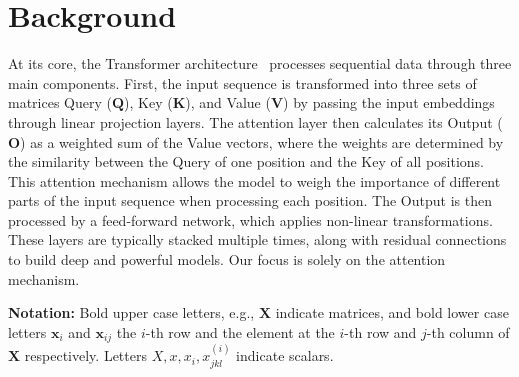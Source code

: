 \section{Background}
\label{related-works}
\par At its core, the Transformer architecture~\cite{Vaswani2017-vf} processes sequential data through three main components. First, the input sequence is transformed into three sets of matrices Query ($\mathbf{Q}$), Key ($\mathbf{K}$), and Value ($\mathbf{V}$) by passing the input embeddings through linear projection layers. The attention layer then calculates its Output ($\mathbf{O}$) as a weighted sum of the Value vectors, where the weights are determined by the similarity between the Query of one position and the Key of all positions. This attention mechanism allows the model to weigh the importance of different parts of the input sequence when processing each position. The Output is then processed by a feed-forward network, which applies non-linear transformations. These layers are typically stacked multiple times, along with residual connections to build deep and powerful models. Our focus is solely on the attention mechanism.

\par \textbf{Notation:} Bold upper case letters, e.g., $\mathbf{X}$ indicate matrices, and bold lower case letters $\mathbf{x}_i$ and $\mathbf{x}_{ij}$ the $i$-th row and the element at the $i$-th row and $j$-th column of $\mathbf{X}$ respectively. Letters $X,x,x_i,x^{(i)}_{jkl}$ indicate scalars.

